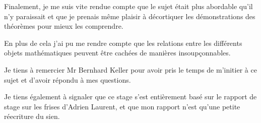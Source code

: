 \documentclass[a4paper]{article}
\theoremstyle{plain}
\theoremstyle{definition}
\theoremstyle{proof}
\theoremstyle{remark}
\begin{document}
Finalement, je me suis vite rendue compte que le sujet était plus abordable qu'il n'y paraissait et que je prenais même plaisir à décortiquer les démonstrations des théorèmes pour mieux les comprendre.

En plus de cela j'ai pu me rendre compte que les relations entre les différents objets mathématiques peuvent être cachées de manières insoupçonnables.

Je tiens à remercier Mr Bernhard Keller pour avoir pris le temps de m'initier à ce sujet et d'avoir répondu à mes questions.

Je tiens également à signaler que ce stage s'est entièrement basé sur le rapport de stage sur les frises  d'Adrien Laurent, et que mon rapport n'est qu'une petite réecriture du sien.
\end{document}
